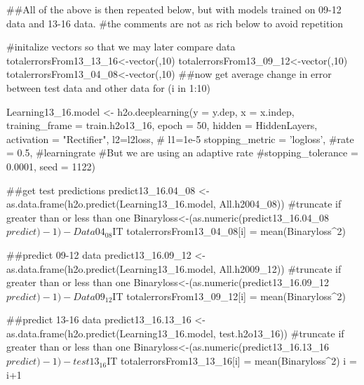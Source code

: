 ##All of the above is then repeated below, but with models trained on  09-12 data and 13-16 data.
#the comments are not as rich below to avoid repetition


#initalize vectors so that we may later compare data
totalerrorsFrom13_13_16<-vector(,10)
totalerrorsFrom13_09_12<-vector(,10)
totalerrorsFrom13_04_08<-vector(,10)
##now get average change in error between test data and other data
for (i in 1:10) {
  Learning13_16.model <- h2o.deeplearning(y = y.dep,
                                          x = x.indep,
                                          training_frame = train.h2o13_16,
                                          epoch = 50,
                                          hidden = HiddenLayers,
                                          activation = "Rectifier",
                                          l2=l2loss,
                                          # l1=1e-5
                                          stopping_metric = 'logloss',
                                          #rate = 0.5, #learningrate
                                          #But we are using an adaptive rate
                                          #stopping_tolerance = 0.0001,
                                          seed = 1122)
  
  ##get test predictions
  predict13_16.04_08 <- as.data.frame(h2o.predict(Learning13_16.model, All.h2004_08))
  #truncate if greater than or less than one
  Binaryloss<-(as.numeric(predict13_16.04_08$predict)-1)-Data04_08$IT
  totalerrorsFrom13_04_08[i] = mean(Binaryloss^2)
  
  ##predict 09-12 data
  predict13_16.09_12 <- as.data.frame(h2o.predict(Learning13_16.model, All.h2009_12))
  #truncate if greater than or less than one
  Binaryloss<-(as.numeric(predict13_16.09_12$predict)-1)-Data09_12$IT
  totalerrorsFrom13_09_12[i] = mean(Binaryloss^2)
  
  ##predict 13-16 data
  predict13_16.13_16 <- as.data.frame(h2o.predict(Learning13_16.model, test.h2o13_16))
  #truncate if greater than or less than one
  Binaryloss<-(as.numeric(predict13_16.13_16$predict)-1)-test13_16$IT
  totalerrorsFrom13_13_16[i] = mean(Binaryloss^2)
  i = i+1
}
















